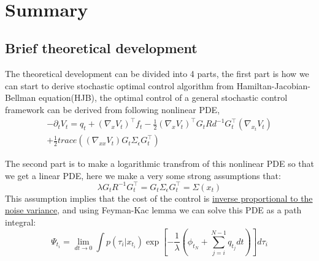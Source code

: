 \documentclass[journal]{IEEEtran}
\begin{document}
%
\IEEEpeerreviewmaketitle


\ \\
\section{Summary}

\subsection{Brief theoretical development}

The theoretical development can be divided into 4 parts, the first part is how we can start to derive stochastic optimal control algorithm from Hamiltan-Jacobian-Bellman equation(HJB),
the optimal control of a general stochastic control framework can be derived from following nonlinear PDE,
\begin{equation}
    \begin{aligned}
    -\partial_t V_t = q_t + (\nabla_xV_t)^{\top}f_t -\frac{1}{2}(\nabla_xV_t)^{\top}G_tRd^{-1}G_t^{\top}(\nabla_{x_t}V_t) \\
     + \frac{1}{2}trace((\nabla_{xx}V_t)G_t\Sigma_{\epsilon}G_t^{\top})
    \label{nonlinear PDE}
    \end{aligned}
  \end{equation}

The second part is to make a logarithmic transfrom of this nonlinear PDE so that we get a linear PDE, here we make a very some strong assumptions that:
\begin{equation}
  \lambda G_t R^{-1}G_t^{\top} = G_t \Sigma_{\epsilon}G_t^{\top} = \Sigma(x_t)
  \label{assumption1}
\end{equation}
This assumption implies that the cost of the control is \underline{inverse proportional to the noise variance}, and using Feyman-Kac lemma we can solve this PDE as a path integral:
\begin{equation}
    \Psi_{t_i} = \lim_{dt\to 0}\int p(\tau_i|x_{t_i}) \exp[-\frac{1}{\lambda}(\phi_{t_N}+\sum_{j=i}^{N-1}q_{t_j}dt)]d\tau_i
    \label{solution1}
  \end{equation}
\end{document}
